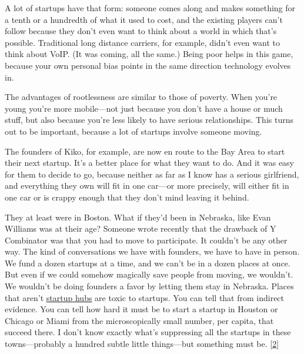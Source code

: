 A lot of startups
                    have that form: someone comes along and makes something for
                    a tenth or a hundredth of what it used to cost, and the
                    existing players can't follow because they don't even want
                    to think about a world in which that's possible. Traditional
                    long distance carriers, for example, didn't even want to
                    think about VoIP. (It was coming, all the same.) Being poor
                    helps in this game, because your own personal bias points in
                    the same direction technology evolves in.

The
                    advantages of rootlessness are similar to those of poverty.
                    When you're young you're more mobile---not just because
                    you don't have a house or much stuff, but also because
                    you're less likely to have serious relationships. This turns
                    out to be important, because a lot of startups involve
                    someone moving.

The founders of Kiko, for
                    example, are now en route to the Bay Area to start their
                    next startup. It's a better place for what they want to do.
                    And it was easy for them to decide to go, because neither as
                    far as I know has a serious girlfriend, and everything they
                    own will fit in one car---or more precisely, will either
                    fit in one car or is crappy enough that they don't mind
                    leaving it behind.

They at least were in Boston.
                    What if they'd been in Nebraska, like Evan Williams was at
                    their age? Someone wrote recently that the drawback of Y
                    Combinator was that you had to move to participate. It
                    couldn't be any other way. The kind of conversations we have
                    with founders, we have to have in person. We fund a dozen
                    startups at a time, and we can't be in a dozen places at
                    once. But even if we could somehow magically save people
                    from moving, we wouldn't. We wouldn't be doing founders a
                    favor by letting them stay in Nebraska. Places that aren't
                    \href{http://www.paulgraham.com/siliconvalley.html}{startup hubs} are toxic to
                    startups. You can tell that from indirect evidence. You can
                    tell how hard it must be to start a startup in Houston or
                    Chicago or Miami from the microscopically small number, per
                    capita, that succeed there. I don't know exactly what's
                    suppressing all the startups in these towns---probably a
                    hundred subtle little things---but something must be.
                    [\href{\#f2n}{2}]

